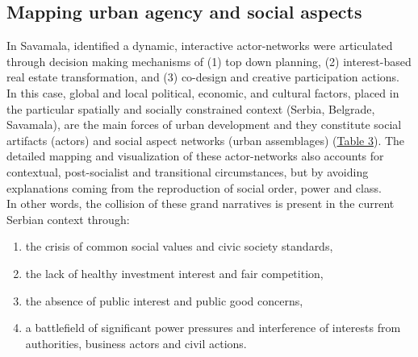 \documentclass[11pt]{report}
\begin{document}
\subsection{Mapping urban agency and social aspects}

In Savamala, identified a dynamic, interactive actor-networks were articulated through decision making mechanisms of
(1) top down planning,
(2) interest-based real estate transformation,
and
(3) co-design and creative participation actions.
In this case, global and local political, economic, and cultural factors, placed in the particular spatially and socially constrained context (Serbia, Belgrade, Savamala), are the main forces of urban development and they constitute social artifacts (actors) and social aspect networks (urban assemblages) (\href{ref}{Table 3}).
The detailed mapping and visualization of these actor-networks also accounts for contextual, post-socialist and transitional circumstances, but by avoiding explanations coming from the reproduction of social order, power and class.
\\

In other words, the collision of these grand narratives is present in the current Serbian context through:
\begin{enumerate}
\item  the crisis of common social values and civic society standards, 
\item the lack of healthy investment interest and fair competition, 
\item the absence of public interest and public good concerns, 
\item a battlefield of significant power pressures and interference of interests from authorities, business actors and civil actions.
\end{enumerate}
\end{document}
